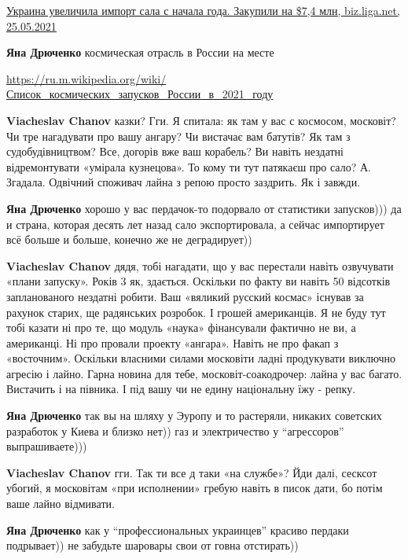\begin{itemize}
\begin{itemize}
\href{https://biz.liga.net/ekonomika/prodovolstvie/novosti/ukraina-uvelichila-import-sala-s-nachala-goda-zakupili-na-74-mln}{%
Украина увеличила импорт сала с начала года. Закупили на \$7,4 млн, biz.liga.net, 25.05.2021%
}

\textbf{Яна Дрюченко} космическая отрасль в России на месте

\url{https://ru.m.wikipedia.org/wiki/Список_космических_запусков_России_в_2021_году}

\textbf{Viacheslav Chanov} казки? Гги.
Я спитала: як там у вас с космосом, московіт? Чи тре нагадувати про вашу ангару? Чи вистачає вам батутів?
Як там з судобудівництвом? Все, догорів вже ваш корабель? Ви навіть нездатні відремонтувати «умірала кузнецова».
То кому ти тут патякаєш про сало?
А. Згадала. Одвічний споживач лайна з репою просто заздрить. Як і завжди.

\textbf{Яна Дрюченко} хорошо у вас пердачок-то подорвало от статистики запусков))) да и страна, которая десять лет назад сало экспортировала, а сейчас импортирует всё больше и больше, конечно же не деградирует))

\textbf{Viacheslav Chanov} дядя, тобі нагадати, що у вас перестали навіть озвучувати «плани запуску». Років 3 як, здається. Оскільки по факту ви навіть 50 відсотків запланованого нездатні робити.
Ваш «вяликий русский космас» існував за рахунок старих, ще радянських розробок. І грошей американців.
Я не буду тут тобі казати ні про те, що модуль «наука» фінансували фактично не ви, а американці. Ні про провали проекту «ангара». Навіть не про факап з «восточним».
Оскільки власними силами московіти ладні продукувати виключно агресію і лайно.
Гарна новина для тебе, московіт-соакодрочер: лайна у вас багато. Вистачить і на півника. І під вашу чи не едину національну їжу - репку.

\textbf{Яна Дрюченко} так вы на шляху у Эуропу и то растеряли, никаких советских разработок у Киева и близко нет)) газ и электричество у \enquote{агрессоров} выпрашиваете)))

\textbf{Viacheslav Chanov} гги. Так ти все д таки «на службе»?
Йди далі, сесксот убогий, я московітам «при исполнении» гребую навіть в писок дати, бо потім ваше лайно відмивати.

\textbf{Яна Дрюченко} как у \enquote{профессиональных украинцев} красиво пердаки подрывает)) не забудьте шаровары свои от говна отстирать))


\end{itemize}
\end{itemize}
